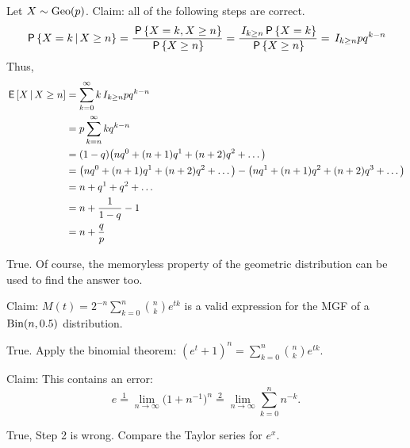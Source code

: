 \documentclass[tf-tutorial-all.tex]{subfiles}
\begin{document}

\begin{truefalse}
  Let $X \sim \mathrm{Geo}(p)$. Claim: all of the following steps are correct.
  \begin{equation*}
    \,\mathsf{P}\left\{X = k \,\middle|\, X \geq n\right\}
    = \frac{\,\mathsf{P}\left\{X=k, X \geq n\right\}}{\,\mathsf{P}\left\{X \geq n\right\}}
    = \frac{\,I_{k \geq n} \,\mathsf{P}\left\{X = k\right\}}{\,\mathsf{P}\left\{X \geq n\right\}}
    = \,I_{k \geq n} pq^{k-n}
  \end{equation*}
  Thus,
  \begin{align*}
    \,\mathsf{E}\left[X \,\middle|\, X \geq n\right] &= \sum_{k=0}^\infty k \,I_{k \geq n} pq^{k-n}\\
    &=  p \sum_{k=n}^\infty kq^{k-n}\\
    &= (1 - q) \big(n q^0 + (n+1) q^1 + (n+2) q^2 + \dots\big)\\
    &= \big(n q^0 + (n+1) q^1 + (n+2) q^2 + \dots\big) - \big(n q^1 + (n+1)q^2 + (n+2)q^3 + \dots\big)\\
    &= n + q^1 + q^2 + \dots\\
    &= n + \frac{1}{1-q} - 1\\
    &= n + \frac{q}{p}\\
  \end{align*}
\begin{solution}
    True. Of course, the memoryless property of the geometric
    distribution can be used to find the answer too.
\end{solution}
\end{truefalse}


\begin{truefalse}
Claim:  $M(t) = 2^{-n} \sum_{k=0}^n \binom{n}{k} e^{tk}$ is a valid expression for the MGF of a $\mathrm{Bin}(n, 0.5)$ distribution.
\begin{solution}
True. Apply the binomial theorem: $(e^t + 1)^n = \sum_{k=0}^n \binom{n}{k} e^{tk}$.
\end{solution}
\end{truefalse}

\begin{truefalse}
 Claim:  This contains an error:
  \begin{equation*}
e \stackrel 1 =  \lim_{n\to\infty} \big(1+n^{-1}\big)^n   \stackrel{2} = \lim_{n\to\infty} \sum^n_{k=0} n^{-k}.
  \end{equation*}
\begin{solution}
True, Step 2 is wrong. Compare the Taylor series for $e^{x}$.
\end{solution}
\end{truefalse}
\end{document}
